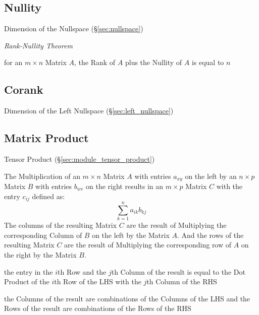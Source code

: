 \subsection{Nullity}\label{sec:nullity}

Dimension of the Nullspace (\S\ref{sec:nullspace})

\emph{Rank-Nullity Theorem}

for an $m \times n$ Matrix $A$, the Rank of $A$ plus the Nullity of $A$ is
equal to $n$



\subsection{Corank}\label{sec:corank}

Dimension of the Left Nullspace (\S\ref{sec:left_nullspace})



\subsection{Matrix Product}\label{sec:matrix_product}

\fist Tensor Product (\S\ref{sec:module_tensor_product})

The Multiplication of an $m \times n$ Matrix $A$ with entries $a_{xy}$
on the left by an $n \times p$ Matrix $B$ with entries $b_{wv}$ on the
right results in an $m \times p$ Matrix $C$ with the entry $c_{ij}$
defined as:
\[
  \sum_{k=1}^n a_{ik} b_{kj}
\]
The columns of the resulting Matrix $C$ are the result of Multiplying
the corresponding Column of $B$ on the left by the Matrix $A$. And the
rows of the resulting Matrix $C$ are the result of Multiplying the
corresponding row of $A$ on the right by the Matrix $B$.

the entry in the $i$th Row and the $j$th Column of the result is equal to the
Dot Product of the $i$th Row of the LHS with the $j$th Column of the RHS

the Columns of the result are combinations of the Columns of the LHS and the
Rows of the result are combinations of the Rows of the RHS

